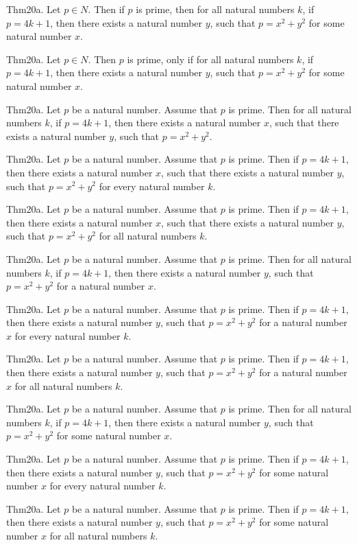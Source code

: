 \documentclass{article}
\begin{document}
Thm20a. Let $p \in N$. Then if $p$ is prime, then for all natural numbers $k$, if $p = 4 k + 1$, then there exists a natural number $y$, such that $p = x ^{ 2}+ y ^{ 2}$ for some natural number $x$.

Thm20a. Let $p \in N$. Then $p$ is prime, only if for all natural numbers $k$, if $p = 4 k + 1$, then there exists a natural number $y$, such that $p = x ^{ 2}+ y ^{ 2}$ for some natural number $x$.

Thm20a. Let $p$ be a natural number. Assume that $p$ is prime. Then for all natural numbers $k$, if $p = 4 k + 1$, then there exists a natural number $x$, such that there exists a natural number $y$, such that $p = x ^{ 2}+ y ^{ 2}$.

Thm20a. Let $p$ be a natural number. Assume that $p$ is prime. Then if $p = 4 k + 1$, then there exists a natural number $x$, such that there exists a natural number $y$, such that $p = x ^{ 2}+ y ^{ 2}$ for every natural number $k$.

Thm20a. Let $p$ be a natural number. Assume that $p$ is prime. Then if $p = 4 k + 1$, then there exists a natural number $x$, such that there exists a natural number $y$, such that $p = x ^{ 2}+ y ^{ 2}$ for all natural numbers $k$.

Thm20a. Let $p$ be a natural number. Assume that $p$ is prime. Then for all natural numbers $k$, if $p = 4 k + 1$, then there exists a natural number $y$, such that $p = x ^{ 2}+ y ^{ 2}$ for a natural number $x$.

Thm20a. Let $p$ be a natural number. Assume that $p$ is prime. Then if $p = 4 k + 1$, then there exists a natural number $y$, such that $p = x ^{ 2}+ y ^{ 2}$ for a natural number $x$ for every natural number $k$.

Thm20a. Let $p$ be a natural number. Assume that $p$ is prime. Then if $p = 4 k + 1$, then there exists a natural number $y$, such that $p = x ^{ 2}+ y ^{ 2}$ for a natural number $x$ for all natural numbers $k$.

Thm20a. Let $p$ be a natural number. Assume that $p$ is prime. Then for all natural numbers $k$, if $p = 4 k + 1$, then there exists a natural number $y$, such that $p = x ^{ 2}+ y ^{ 2}$ for some natural number $x$.

Thm20a. Let $p$ be a natural number. Assume that $p$ is prime. Then if $p = 4 k + 1$, then there exists a natural number $y$, such that $p = x ^{ 2}+ y ^{ 2}$ for some natural number $x$ for every natural number $k$.

Thm20a. Let $p$ be a natural number. Assume that $p$ is prime. Then if $p = 4 k + 1$, then there exists a natural number $y$, such that $p = x ^{ 2}+ y ^{ 2}$ for some natural number $x$ for all natural numbers $k$.
\end{document}
